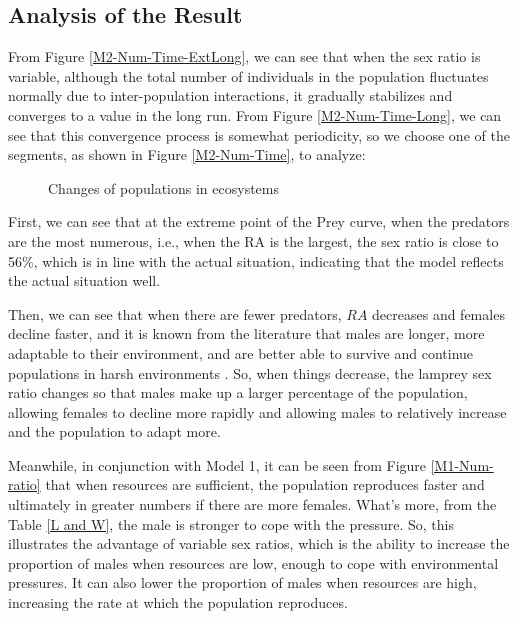 \documentclass[12pt]{article}  %
\begin{document}
\subsection{Analysis of the Result}
From Figure \ref{M2-Num-Time-ExtLong}, we can see that when the sex ratio is variable, although the total number of individuals in the population fluctuates normally due to inter-population interactions, it gradually stabilizes and converges to a value in the long run. From Figure \ref{M2-Num-Time-Long}, we can see that this convergence process is somewhat periodicity, so we choose one of the segments, as shown in Figure \ref{M2-Num-Time}, to analyze:

\begin{figure}[!h]
	\centering
	\quad    %
	\quad
	\quad	
	\caption{Changes of populations in ecosystems}
\end{figure}

First, we can see that at the extreme point of the Prey curve, when the predators are the most numerous, i.e., when the RA is the largest, the sex ratio is close to 56\%, which is
in line with the actual situation, indicating that the model reflects the actual situation well.

Then, we can see that when there are fewer predators, $RA$ decreases and females decline faster, and it is known from the literature that males are longer, more adaptable to their environment, and are better able to survive and continue populations in harsh environments \cite{4}\cite{9}. So, when things decrease, the lamprey sex ratio changes so that males make up a larger percentage of the population, allowing females to decline more rapidly and allowing males to relatively increase and the population to adapt more.

Meanwhile, in conjunction with Model 1, it can be seen from Figure \ref{M1-Num-ratio} that when resources are sufficient, the population reproduces faster and ultimately in greater numbers if there are more females. What's more, from the Table \ref{L and W}, the male is stronger to cope with the pressure. So, this illustrates the advantage of variable sex ratios, which is the ability to increase the proportion of males when resources are low, enough to cope with environmental pressures. It can also lower the proportion of males when resources are high, increasing the rate at which the population reproduces.
\end{document}
